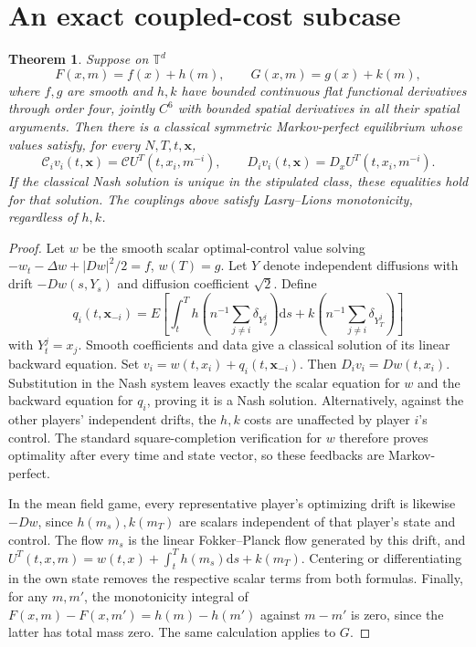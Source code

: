 \documentclass[11pt]{article}
\newtheorem{theorem}{Theorem}
\newcommand{\T}{\mathbb T}
\newcommand{\dd}{\mathrm d}
\begin{document}
\section{An exact coupled-cost subcase}
\begin{theorem}\label{exact}
Suppose on $\T^d$
\[
 F(x,m)=f(x)+h(m),\qquad G(x,m)=g(x)+k(m),
\]
where $f,g$ are smooth and $h,k$ have bounded continuous flat functional derivatives through order four, jointly $C^6$ with bounded spatial derivatives in all their spatial arguments. Then there is a classical symmetric Markov-perfect equilibrium whose values satisfy, for every $N,T,t,\boldsymbol x$,
\[
 \mathcal C_i v_i(t,\boldsymbol x)=\mathcal C U^T(t,x_i,m^{-i}),\qquad
 D_iv_i(t,\boldsymbol x)=D_xU^T(t,x_i,m^{-i}).
\]
If the classical Nash solution is unique in the stipulated class, these equalities hold for that solution. The couplings above satisfy Lasry--Lions monotonicity, regardless of $h,k$.
\end{theorem}
\begin{proof}
Let $w$ be the smooth scalar optimal-control value solving
$-w_t-\Delta w+|Dw|^2/2=f$, $w(T)=g$.
Let $Y$ denote independent diffusions with drift $-Dw(s,Y_s)$ and diffusion coefficient $\sqrt2$. Define
\[
 q_i(t,\boldsymbol x_{-i})=E\left[\int_t^T h\left(n^{-1}\sum_{j\ne i}\delta_{Y_s^j}\right)\dd s
       +k\left(n^{-1}\sum_{j\ne i}\delta_{Y_T^j}\right)\right]
\]
with $Y_t^j=x_j$. Smooth coefficients and data give a classical solution of its linear backward equation. Set $v_i=w(t,x_i)+q_i(t,\boldsymbol x_{-i})$. Then $D_iv_i=Dw(t,x_i)$. Substitution in the Nash system leaves exactly the scalar equation for $w$ and the backward equation for $q_i$, proving it is a Nash solution. Alternatively, against the other players' independent drifts, the $h,k$ costs are unaffected by player $i$'s control. The standard square-completion verification for $w$ therefore proves optimality after every time and state vector, so these feedbacks are Markov-perfect.

In the mean field game, every representative player's optimizing drift is likewise $-Dw$, since $h(m_s),k(m_T)$ are scalars independent of that player's state and control. The flow $m_s$ is the linear Fokker--Planck flow generated by this drift, and
$U^T(t,x,m)=w(t,x)+\int_t^Th(m_s)\dd s+k(m_T)$.
Centering or differentiating in the own state removes the respective scalar terms from both formulas. Finally, for any $m,m'$, the monotonicity integral of $F(x,m)-F(x,m')=h(m)-h(m')$ against $m-m'$ is zero, since the latter has total mass zero. The same calculation applies to $G$.
\end{proof}
\end{document}
